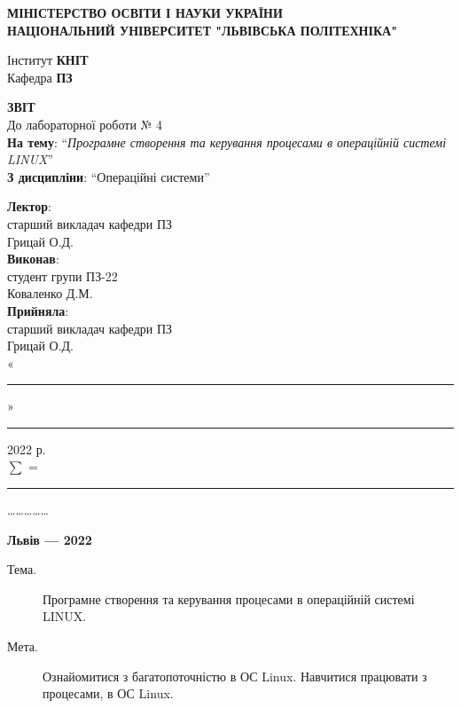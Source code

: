 \documentclass{article}
\newcommand\subject{Операційні системи}
\newcommand\lecturer{старший викладач кафедри ПЗ\\Грицай О.Д.}
\newcommand\teacher{старший викладач кафедри ПЗ\\Грицай О.Д.}
\newcommand\mygroup{ПЗ-22}
\newcommand\lab{4}
\newcommand\theme{Програмне створення та керування процесами в операційній системі
	LINUX}
\newcommand\purpose{Ознайомитися з багатопоточністю в ОС Linux. Навчитися працювати з
	процесами, в ОС Linux}
\begin{document}
\begin{normalsize}
	\begin{titlepage}
		\thispagestyle{empty}
		\begin{center}
			\textbf{МІНІСТЕРСТВО ОСВІТИ І НАУКИ УКРАЇНИ\\
				НАЦІОНАЛЬНИЙ УНІВЕРСИТЕТ "ЛЬВІВСЬКА ПОЛІТЕХНІКА"}
		\end{center}
		\begin{flushright}
			Інститут \textbf{КНІТ}\\
			Кафедра \textbf{ПЗ}
		\end{flushright}
		\vspace{200pt}
		\begin{center}
			\textbf{ЗВІТ}\\
			\vspace{10pt}
			До лабораторної роботи № \lab\\
			\textbf{На тему}: “\textit{\theme}”\\
			\textbf{З дисципліни}: “\subject”
		\end{center}
		\vspace{112pt}
		\begin{flushright}
			
			\textbf{Лектор}:\\
			\lecturer\\
			\vspace{28pt}
			\textbf{Виконав}:\\
			
			студент групи \mygroup\\
			Коваленко Д.М.\\
			\vspace{28pt}
			\textbf{Прийняла}:\\
			
			\teacher\\
			
			\vspace{28pt}
			«\rule{1cm}{0.15mm}» \rule{1.5cm}{0.15mm} 2022 р.\\
			$\sum$ = \rule{1cm}{0.15mm}……………\\
			
		\end{flushright}
		\vspace{\fill}
		\begin{center}
			\textbf{Львів — 2022}
		\end{center}
	\end{titlepage}
		
	\begin{description}
		\item[Тема.] \theme.
		\item[Мета.] \purpose.
	\end{description}


\end{normalsize}
\end{document}
